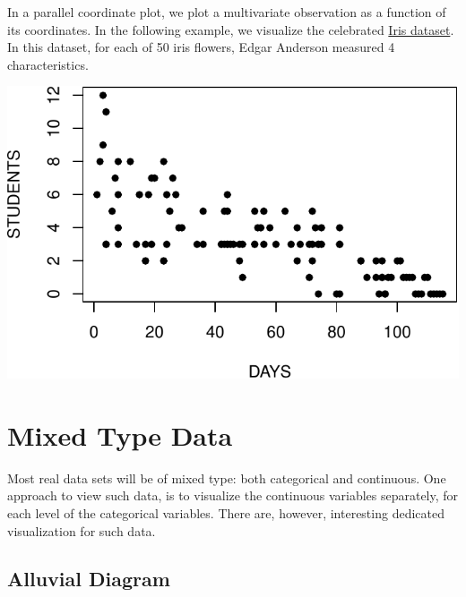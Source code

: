 \documentclass[]{book}
\newenvironment{Shaded}{\begin{snugshade}}{\end{snugshade}}
\newcommand{\KeywordTok}[1]{\textcolor[rgb]{0.13,0.29,0.53}{\textbf{#1}}}
\newcommand{\DataTypeTok}[1]{\textcolor[rgb]{0.13,0.29,0.53}{#1}}
\newcommand{\DecValTok}[1]{\textcolor[rgb]{0.00,0.00,0.81}{#1}}
\newcommand{\StringTok}[1]{\textcolor[rgb]{0.31,0.60,0.02}{#1}}
\newcommand{\OperatorTok}[1]{\textcolor[rgb]{0.81,0.36,0.00}{\textbf{#1}}}
\newcommand{\NormalTok}[1]{#1}
\theoremstyle{definition}
\theoremstyle{definition}
\theoremstyle{definition}
\theoremstyle{remark}
\begin{document}
In a parallel coordinate plot, we plot a multivariate observation as a
function of its coordinates. In the following example, we visualize the
celebrated
\href{https://en.wikipedia.org/wiki/Iris_flower_data_set}{Iris dataset}.
In this dataset, for each of 50 iris flowers, Edgar Anderson measured 4
characteristics.

\begin{Shaded}
\end{Shaded}

\includegraphics[width=0.5\linewidth]{Rcourse_files/figure-latex/unnamed-chunk-143-1}

\section{Mixed Type Data}\label{mixed-type-data}

Most real data sets will be of mixed type: both categorical and
continuous. One approach to view such data, is to visualize the
continuous variables separately, for each level of the categorical
variables. There are, however, interesting dedicated visualization for
such data.

\subsection{Alluvial Diagram}\label{alluvial}
\end{document}
